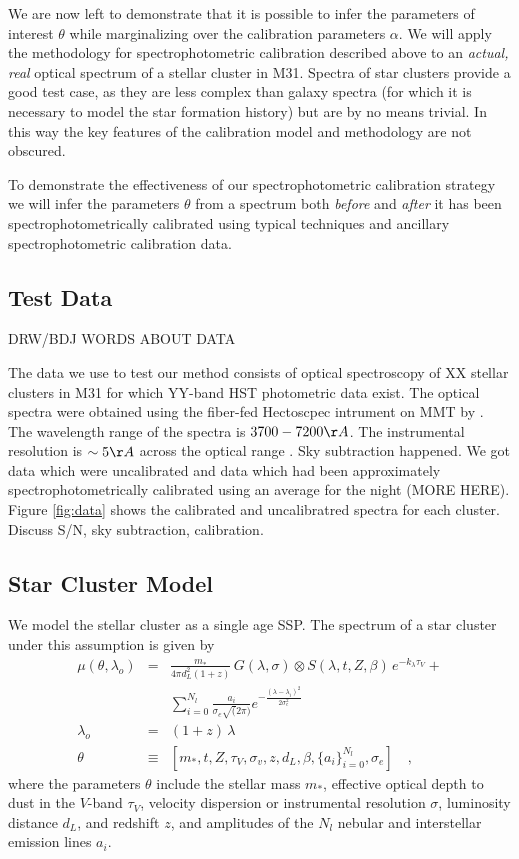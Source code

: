 \documentclass[12pt, letterpaper, preprint]{aastex}
\begin{document}
We are now left to demonstrate that it is possible to infer the
parameters of interest $\theta$ while marginalizing over the
calibration parameters $\alpha$.  We will apply the methodology for
spectrophotometric calibration described above to an \emph{actual,
real} optical spectrum of a stellar cluster in M31.  Spectra of star
clusters provide a good test case, as they are less complex than
galaxy spectra (for which it is necessary to model the star formation
history) but are by no means trivial. In this way the key features of
the calibration model and methodology are not obscured.  

To demonstrate the effectiveness of our spectrophotometric calibration
strategy we will infer the parameters $\theta$ from a spectrum both
\emph{before} and \emph{after} it has been spectrophotometrically
calibrated using typical techniques and ancillary spectrophotometric
calibration data.

\subsection{Test Data}

DRW/BDJ WORDS ABOUT DATA

The data we use to test our method consists of optical spectroscopy of
XX stellar clusters in M31 for which YY-band HST photometric data
exist.  The optical spectra were obtained using the fiber-fed
Hectoscpec intrument on MMT by \citet{caldwell}.  The wavelength range
of the spectra is $3700-7200 \AA$. The instrumental resolution is
$\sim 5\AA$ across the optical range \citep{fabricant13}.  Sky
subtraction happened.  We got data which were uncalibrated and data
which had been approximately spectrophotometrically calibrated using
an average for the night (MORE HERE). Figure \ref{fig:data} shows the
calibrated and uncalibratred spectra for each cluster.  Discuss S/N,
sky subtraction, calibration.


\subsection{Star Cluster Model}
We model the stellar cluster as a single age SSP. The spectrum of a
star cluster under this assumption is given by
\begin{eqnarray}\displaystyle\label{eq:MeanModel} 
\mu(\theta, \lambda_o) & = &
\frac{m_*}{4\pi d_L^2(1+z)} \, G(\lambda,\sigma) \otimes 
S(\lambda, t, Z , \beta) \, e^ {-k_\lambda\tau_V}  + \\
& & \sum_{i=0}^{N_l} \frac{a_i}{\sigma_e\sqrt(2\pi)} e^{-\frac{(\lambda - \lambda_i)^2}{2\sigma_e^2}}
\nonumber \\ 
\lambda_o & = & (1+z)\,\lambda 
\\
\theta & \equiv & \left[ m_*, t, Z, \tau_V, \sigma_v, z, d_L, \beta,
  \{a_i\}_{i=0}^{N_l}, \sigma_e \right]
\quad ,
\end{eqnarray} where the parameters $\theta$ include 
the stellar mass $m_*$, 
effective optical depth to dust in the $V$-band $\tau_V$,
velocity dispersion or instrumental resolution $\sigma$, 
luminosity distance $d_L$, 
and redshift $z$,
and amplitudes of the $N_l$ nebular and interstellar emission lines
$a_i$.
\end{document}
